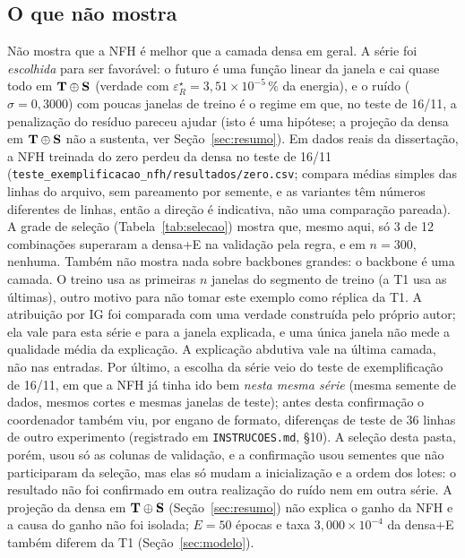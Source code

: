 \documentclass[11pt,a4paper]{article}
\begin{document}
\subsection*{O que não mostra}
Não mostra que a NFH é melhor que a camada densa em geral. A série foi \emph{escolhida} para ser favorável: o futuro é uma função linear da janela e cai quase todo em $\mathbf{T}\oplus\mathbf{S}$ (verdade com $\varepsilon_R^\star=3,51\times 10^{-5}\,\%$ da energia), e o ruído ($\sigma=0,3000$) com poucas janelas de treino é o regime em que, no teste de 16/11, a penalização do resíduo pareceu ajudar (isto é uma hipótese; a projeção da densa em $\mathbf{T}\oplus\mathbf{S}$ não a sustenta, ver Seção~\ref{sec:resumo}). Em dados reais da dissertação, a NFH treinada do zero perdeu da densa no teste de 16/11 (\texttt{teste\_exemplificacao\_nfh/resultados/zero.csv}; compara médias simples das linhas do arquivo, sem pareamento por semente, e as variantes têm números diferentes de linhas, então a direção é indicativa, não uma comparação pareada). A grade de seleção (Tabela~\ref{tab:selecao}) mostra que, mesmo aqui, só 3 de 12 combinações superaram a densa+E na validação pela regra, e em $n=300$, nenhuma. Também não mostra nada sobre backbones grandes: o backbone é uma camada. O treino usa as primeiras $n$ janelas do segmento de treino (a T1 usa as últimas), outro motivo para não tomar este exemplo como réplica da T1. A atribuição por IG foi comparada com uma verdade construída pelo próprio autor; ela vale para esta série e para a janela explicada, e uma única janela não mede a qualidade média da explicação. A explicação abdutiva vale na última camada, não nas entradas. Por último, a escolha da série veio do teste de exemplificação de 16/11, em que a NFH já tinha ido bem \emph{nesta mesma série} (mesma semente de dados, mesmos cortes e mesmas janelas de teste); antes desta confirmação o coordenador também viu, por engano de formato, diferenças de teste de 36 linhas de outro experimento (registrado em \texttt{INSTRUCOES.md}, \S10). A seleção desta pasta, porém, usou só as colunas de validação, e a confirmação usou sementes que não participaram da seleção, mas elas só mudam a inicialização e a ordem dos lotes: o resultado não foi confirmado em outra realização do ruído nem em outra série. A projeção da densa em $\mathbf{T}\oplus\mathbf{S}$ (Seção~\ref{sec:resumo}) não explica o ganho da NFH e a causa do ganho não foi isolada; $E=50$ épocas e taxa $3,000\times 10^{-4}$ da densa+E também diferem da T1 (Seção~\ref{sec:modelo}).
\end{document}
